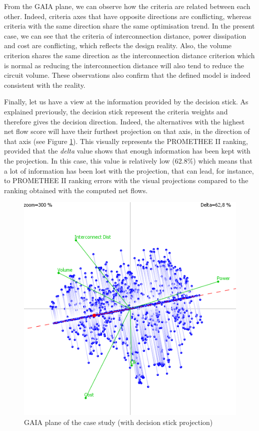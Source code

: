 From the GAIA plane, we can observe how the criteria are related between each other. Indeed, criteria axes that have opposite directions are conflicting, whereas criteria with the same direction share the same optimisation trend. In the present case, we can see that the criteria of interconnection distance, power dissipation and cost are conflicting, which reflects the design reality. Also, the volume criterion shares the same direction as the interconnection distance criterion which is normal as reducing the interconnection distance will also tend to reduce the circuit volume. These observations also confirm that the defined model is indeed consistent with the reality.

Finally, let us have a view at the information provided by the decision stick. As explained previously, the decision stick represent the criteria weights and therefore gives the decision direction. Indeed, the alternatives with the highest net flow score will have their furthest projection on that axis, in the direction of that axis (see Figure \ref{fig:gva804stick}). This visually represents the PROMETHEE II ranking, provided that the \textit{delta} value shows that enough information has been kept with the projection. In this case, this value is relatively low (62.8\%) which means that a lot of information has been lost with the projection, that can lead, for instance, to PROMETHEE II ranking errors with the visual projections compared to the ranking obtained with the computed net flows.

\begin{figure}[h!]
\begin{center}
\includegraphics[width=0.8\linewidth]{gva804stick}
\end{center}
\caption{GAIA plane of the case study (with decision stick projection)}
\label{fig:gva804stick}
\end{figure}

